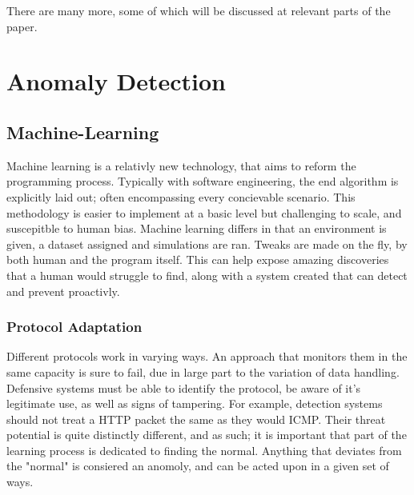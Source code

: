 

There are many more, some of which will be discussed at relevant parts of the paper.


\section{Anomaly Detection}
\subsection{Machine-Learning}
Machine learning is a relativly new technology, that aims to reform the programming process. Typically with software engineering, the end algorithm is explicitly laid out; often encompassing every concievable scenario.
This methodology is easier to implement at a basic level but challenging to scale, and suscepitble to human bias. Machine learning differs in that an environment is given, a dataset assigned and simulations are ran. 
Tweaks are made on the fly, by both human and the program itself. This can help expose amazing discoveries that a human would struggle to find, along with a system created that can detect and prevent proactivly.
\subsubsection{Protocol Adaptation}
Different protocols work in varying ways. An approach that monitors them in the same capacity is sure to fail, due in large part to the variation of data handling. Defensive systems must be able to identify the protocol,
be aware of it's legitimate use, as well as signs of tampering. For example, detection systems should not treat a HTTP packet the same as they would ICMP. Their threat potential is quite distinctly different, and as such;
it is important that part of the learning process is dedicated to finding the normal. Anything that deviates from the "normal" is consiered an anomoly, and can be acted upon in a given set of ways.
